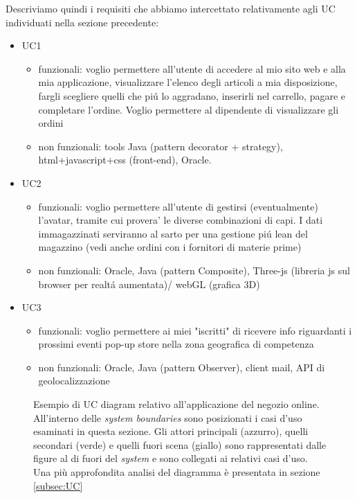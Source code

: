 \documentclass[12pt]{article}
\begin{document}
Descriviamo quindi i requisiti che abbiamo intercettato relativamente agli UC individuati nella sezione precedente: 
\begin{itemize}
	\item UC1
		\begin{itemize}
		\item funzionali: voglio permettere all'utente di accedere al mio sito web e alla mia applicazione, visualizzare l'elenco degli articoli a mia disposizione, fargli scegliere quelli che pi\'u lo aggradano, inserirli nel carrello, pagare e completare l'ordine. Voglio permettere al dipendente di visualizzare gli ordini 
		\item non funzionali: tools Java (pattern decorator + strategy), html+javascript+css (front-end), Oracle. 
		\end{itemize}
	\item UC2
		\begin{itemize}
		\item funzionali: voglio permettere all'utente di gestirsi (eventualmente) l'avatar, tramite cui provera' le diverse combinazioni di capi. I dati immagazzinati serviranno al sarto per una gestione pi\'u lean del magazzino (vedi anche ordini con i fornitori di materie prime)
		\item non funzionali: Oracle, Java (pattern Composite), Three-js (libreria js sul browser per realt\'a aumentata)/ webGL (grafica 3D)
		\end{itemize}
	\item UC3
		\begin{itemize}
		\item funzionali: voglio permettere ai miei "iscritti" di ricevere info riguardanti i prossimi eventi pop-up store nella zona geografica di competenza 
		\item non funzionali: Oracle, Java (pattern Observer), client mail, API di geolocalizzazione
		\end{itemize}
\end{itemize}


\vspace{1em}
\begin{figure}[ht]
  \centering
   \makebox[\textwidth][c]{}
  \caption{\small Esempio di UC diagram relativo all'applicazione del negozio online. All'interno delle {\em system boundaries} sono posizionati i casi d'uso esaminati in questa sezione. Gli attori principali (azzurro), quelli secondari (verde) e quelli fuori scena (giallo) sono rappresentati dalle figure al di fuori del {\em system} e sono collegati ai relativi casi d'uso. Una più approfondita analisi del diagramma è presentata in sezione \ref{subsec:UC}}
  \label{fig:UC_diagram}
\end{figure}
\end{document}
